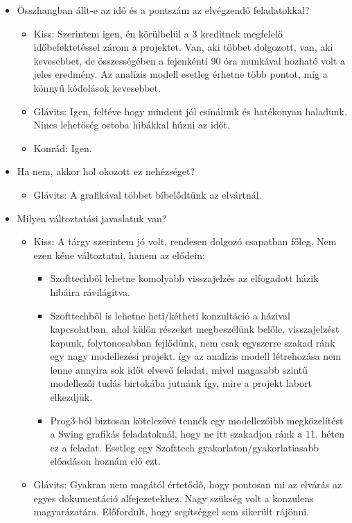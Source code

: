 \begin{itemize}
\begin{itemize}
\end{itemize}
\item Összhangban állt-e az idő és a pontszám az elvégzendő feladatokkal? \newline
\begin{itemize}
	\item Kiss: Szerintem igen, én körülbelül a 3 kreditnek megfelelő időbefektetéssel zárom a projektet. Van, aki többet dolgozott, van, aki kevesebbet, de összességében a fejenkénti 90 óra munkával hozható volt a jeles eredmény. Az analízis modell esetleg érhetne több pontot, míg a könnyű kódolások kevesebbet.
	\item Glávits: Igen, feltéve hogy mindent jól csinálunk és hatékonyan haladunk. Nincs lehetőség ostoba hibákkal húzni az időt.
	\item Konrád: Igen.
\end{itemize}
\item Ha nem, akkor hol okozott ez nehézséget? \newline
\begin{itemize}
	\item Glávits: A grafikával többet bíbelődtünk az elvártnál.
\end{itemize}
\item Milyen változtatási javaslatuk van? \newline
\begin{itemize}
	\item Kiss: A tárgy szerintem jó volt, rendesen dolgozó csapatban főleg. Nem ezen kéne változtatni, hanem az elődein:
		\begin{itemize}
			\item Szofttechből lehetne komolyabb visszajelzés az elfogadott házik hibáira rávilágítva.
			\item Szofttechből is lehetne heti/kétheti konzultáció a házival kapcsolatban, ahol külön részeket megbeszélünk belőle, visszajelzést kapunk, folytonosabban fejlődünk, nem csak egyszerre szakad ránk egy nagy modellezési projekt. így az analízis modell létrehozása nem lenne annyira sok időt elvevő feladat, mivel magasabb szintű modellezői tudás birtokába jutnánk így, mire a projekt labort elkezdjük.
			\item Prog3-ból biztosan kötelezővé tennék egy modellezőibb megközelítést a Swing grafikás feladatoknál, hogy ne itt szakadjon ránk a 11. héten ez a feladat. Esetleg egy Szofttech gyakorlaton/gyakorlatiasabb előadáson hoznám elő ezt.
		\end{itemize}
	\item Glávits: Gyakran nem magától értetődő, hogy pontosan mi az elvárás az egyes dokumentáció alfejezetekhez. Nagy szükség volt a konzulens magyarázatára. Előfordult, hogy segítséggel sem sikerült rájönni.

\end{itemize}
\end{itemize}
